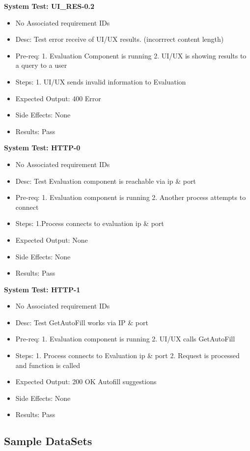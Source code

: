\medskip\textbf{System Test: UI\_RES-0.2}
\begin{itemize}
    \item No Associated requirement IDs
    \item Desc: Test error receive of UI/UX results. (incorrrect content length)
    \item Pre-req: 1. Evaluation Component is running 2. UI/UX is showing results to a query to a user
    \item Steps: 1. UI/UX sends invalid information to Evaluation
    \item Expected Output: 400 Error
    \item Side Effects: None
    \item Results: Pass
\end{itemize}

\medskip\textbf{System Test: HTTP-0}
\begin{itemize}
    \item No Associated requirement IDs
    \item Desc: Test Evaluation component is reachable via ip \& port
    \item Pre-req: 1. Evaluation component is running 2. Another process attempts to connect
    \item Steps: 1.Process connects to evaluation ip \& port
    \item Expected Output: None
    \item Side Effects: None
    \item Results: Pass
\end{itemize}

\medskip\textbf{System Test: HTTP-1}
\begin{itemize}
    \item No Associated requirement IDs
    \item Desc: Test GetAutoFill works via IP \& port
    \item Pre-req: 1. Evaluation component is running 2. UI/UX calls GetAutoFill
    \item Steps: 1. Process connects to Evaluation ip \& port 2. Request is processed and function is called
    \item Expected Output: 200 OK Autofill suggestions
    \item Side Effects: None
    \item Results: Pass
\end{itemize}

\subsection*{Sample DataSets}

